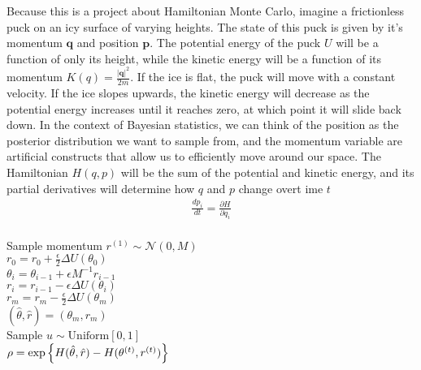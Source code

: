 Because this is a project about Hamiltonian Monte Carlo, imagine a frictionless puck on an icy surface of varying heights. The state of this puck is given by it's momentum $\bm{q}$ and position $\bm{p}$. The potential energy of the puck $U$ will be a function of only its height, while the kinetic energy will be a function of its momentum $K(q)=\frac{|\bm{q}|^2}{2m}$. If the ice is flat, the puck will move with a constant velocity. If the ice slopes upwards, the kinetic energy will decrease as the potential energy increases until it reaches zero, at which point it will slide back down. In the context of Bayesian statistics, we can think of the position as the posterior distribution we want to sample from, and the momentum variable are artificial constructs that allow us to efficiently move around our space. The Hamiltonian $H(q, p)$ will be the sum of the potential and kinetic energy, and its partial derivatives will determine how $q$ and $p$ change overt ime $t$
\begin{equation*}
	\begin{split}
	\frac{d p_i}{d t}=\frac{\partial H}{\partial q_i}\\
	\end{split}
\end{equation*}

\begin{algorithm}[H]
	 {
		Sample momentum $r^{(1)}\sim\mathcal{N}(0, M)$\\
		$r_0=r_0+\frac{\epsilon}{2}\Delta U(\theta_0)$\\
		 {
			$\theta_i=\theta_{i-1}+\epsilon M^{-1}r_{i-1}$\\
			$r_i = r_{i-1} - \epsilon  \Delta U(\theta_i)$\\
		}
		$r_m = r_m -\frac{\epsilon}{2}\Delta U(\theta_m)$\\
		$(\hat{\theta}, \hat{r})=(\theta_m,r_m)$\\
		Sample $u\sim\mathrm{Uniform}[0, 1]$\\
		$\rho = \exp\left\lbrace H(\hat{\theta}, \hat{r})-H(\theta^{(t)}, r^{(t)}) \right\rbrace$\\
	}
\end{algorithm}